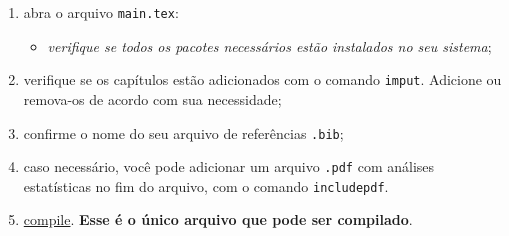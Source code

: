 \documentclass[a4paper,10pt]{article}
\begin{document}
\begin{enumerate}
\item abra o arquivo \texttt{main.tex}:
\begin{itemize}
 \item \textit{verifique se todos os pacotes necessários estão instalados no seu sistema};
\end{itemize}
\item verifique se os capítulos estão adicionados com o comando \texttt{imput}. Adicione ou remova-os de acordo com sua necessidade;
\item confirme o nome do seu arquivo de referências \texttt{.bib};
\item caso necessário, você pode adicionar um arquivo \texttt{.pdf} com análises estatísticas no fim do arquivo, com o comando \texttt{includepdf}.
\item \underline{compile}. \textbf{Esse é o único arquivo que pode ser compilado}.
\end{enumerate}
\end{document}
